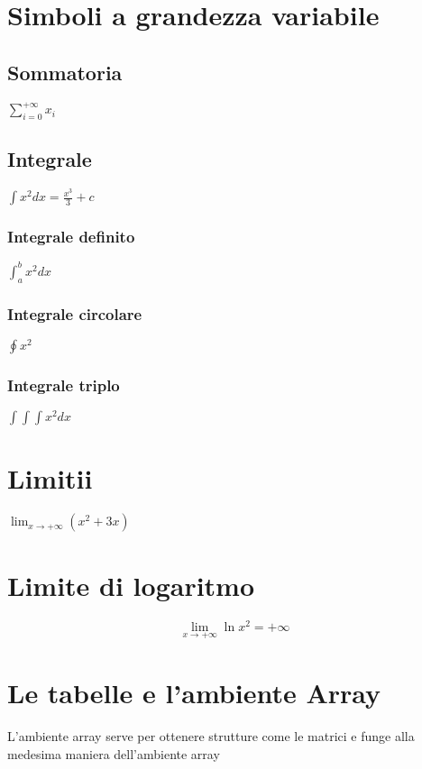 \documentclass[a4paper]{article}
\begin{document}
\section{Simboli a grandezza variabile}

\subsection{Sommatoria}

$
\sum_{i=0}^{+\infty} x_i
$

\subsection{Integrale}

$
\int x^2 dx = \frac{x^3}{3} + c
$

\subsubsection{Integrale definito}
$
\int_a^b x^2 dx
$

\subsubsection{Integrale circolare}
$
\oint x^2
$

\subsubsection{Integrale triplo}
$ \int \!\!\!\! \int \!\!\!\! \int x^2 dx $


\section{Limitii}

$
\lim_{x \rightarrow +\infty} (x^2+3x)
$

\section{Limite di logaritmo}

$$
\lim_{x \rightarrow +\infty} \ln x^2 = +\infty
$$

\section{Le tabelle e l'ambiente Array}

L'ambiente array serve per ottenere strutture come le matrici e funge alla medesima maniera dell'ambiente array
\end{document}
